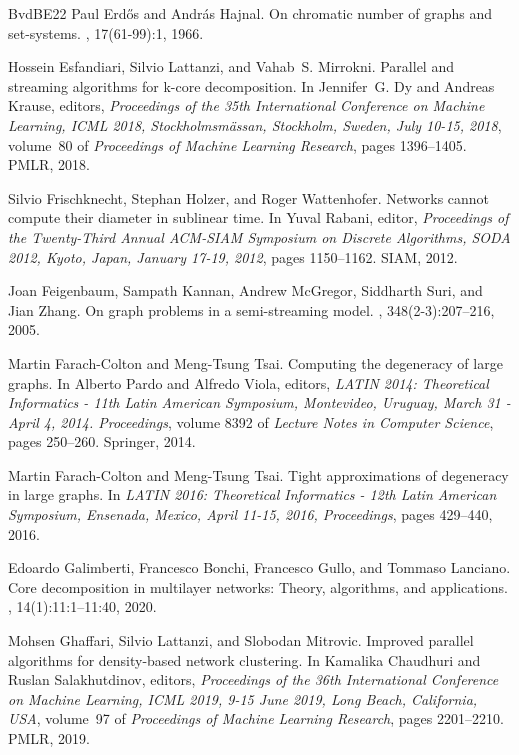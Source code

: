 \documentclass[11pt,letterpaper]{article}
\theoremstyle{definition}
\begin{document}
\begin{thebibliography}{BvdBE{\etalchar{+}}22}
Paul Erd{\H{o}}s and Andr{\'a}s Hajnal.
\newblock On chromatic number of graphs and set-systems.
, 17(61-99):1, 1966.

Hossein Esfandiari, Silvio Lattanzi, and Vahab~S. Mirrokni.
\newblock Parallel and streaming algorithms for k-core decomposition.
\newblock In Jennifer~G. Dy and Andreas Krause, editors, {\em Proceedings of the 35th International Conference on Machine Learning, {ICML} 2018, Stockholmsm{\"{a}}ssan, Stockholm, Sweden, July 10-15, 2018}, volume~80 of {\em Proceedings of Machine Learning Research}, pages 1396--1405. {PMLR}, 2018.

Silvio Frischknecht, Stephan Holzer, and Roger Wattenhofer.
\newblock Networks cannot compute their diameter in sublinear time.
\newblock In Yuval Rabani, editor, {\em Proceedings of the Twenty-Third Annual {ACM-SIAM} Symposium on Discrete Algorithms, {SODA} 2012, Kyoto, Japan, January 17-19, 2012}, pages 1150--1162. {SIAM}, 2012.

Joan Feigenbaum, Sampath Kannan, Andrew McGregor, Siddharth Suri, and Jian Zhang.
\newblock On graph problems in a semi-streaming model.
, 348(2-3):207--216, 2005.

Martin Farach{-}Colton and Meng{-}Tsung Tsai.
\newblock Computing the degeneracy of large graphs.
\newblock In Alberto Pardo and Alfredo Viola, editors, {\em {LATIN} 2014: Theoretical Informatics - 11th Latin American Symposium, Montevideo, Uruguay, March 31 - April 4, 2014. Proceedings}, volume 8392 of {\em Lecture Notes in Computer Science}, pages 250--260. Springer, 2014.

Martin Farach{-}Colton and Meng{-}Tsung Tsai.
\newblock Tight approximations of degeneracy in large graphs.
\newblock In {\em {LATIN} 2016: Theoretical Informatics - 12th Latin American Symposium, Ensenada, Mexico, April 11-15, 2016, Proceedings}, pages 429--440, 2016.

Edoardo Galimberti, Francesco Bonchi, Francesco Gullo, and Tommaso Lanciano.
\newblock Core decomposition in multilayer networks: Theory, algorithms, and applications.
, 14(1):11:1--11:40, 2020.

Mohsen Ghaffari, Silvio Lattanzi, and Slobodan Mitrovic.
\newblock Improved parallel algorithms for density-based network clustering.
\newblock In Kamalika Chaudhuri and Ruslan Salakhutdinov, editors, {\em Proceedings of the 36th International Conference on Machine Learning, {ICML} 2019, 9-15 June 2019, Long Beach, California, {USA}}, volume~97 of {\em Proceedings of Machine Learning Research}, pages 2201--2210. {PMLR}, 2019.


\end{thebibliography}
\end{document}
